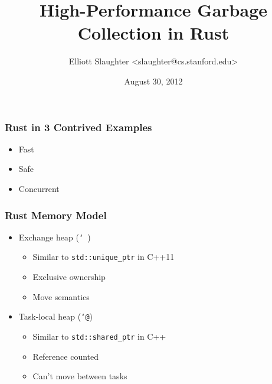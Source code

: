 \documentclass[ignorenonframetext,12pt]{beamer}
\title{High-Performance Garbage Collection in Rust}
\author{Elliott Slaughter \textless{}slaughter@cs.stanford.edu\textgreater{}}
\date{August 30, 2012}
\begin{document}
\frame{\titlepage}

\begin{frame}
\Large{}
\end{frame}

\begin{frame}[fragile]\frametitle{Rust in 3 Contrived Examples}
\begin{itemize}
  \item<alert@2> Fast
  \item<alert@3> Safe
  \item<alert@4> Concurrent
\end{itemize}

\begin{overlayarea}{\textwidth}{\textheight}
\only<2>{}
\only<3>{}
\end{overlayarea}
\end{frame}

\begin{frame}\frametitle{Rust Memory Model}
\begin{itemize}
  \item Exchange heap (\texttt{\char`~})
  \begin{itemize}
    \item Similar to \texttt{std::unique\_ptr} in C++11
    \item Exclusive ownership
    \item Move semantics
  \end{itemize}
  \item Task-local heap (\texttt{\char`@})
  \begin{itemize}
    \item Similar to \texttt{std::shared\_ptr} in C++
    \item Reference counted
    \item Can't move between tasks
  \end{itemize}
\end{itemize}
\end{frame}
\end{document}
